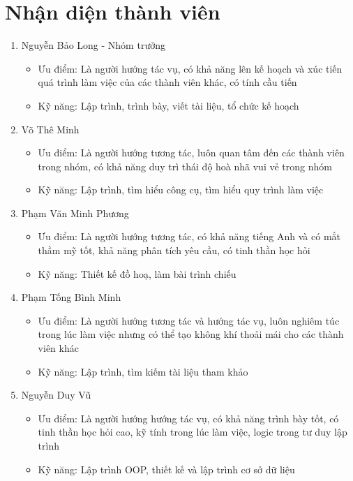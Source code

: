 \documentclass[a4paper, 12pt]{article}
\begin{document}
    \section{Nhận diện thành viên}
    \label{sec:regconize}
    \begin{enumerate}
        \item Nguyễn Bảo Long - Nhóm trưởng
        \begin{itemize}
            \item Ưu điểm: Là người hướng tác vụ, có khả năng lên kế hoạch và xúc tiến quá trình làm việc của các thành viên khác, có tính cầu tiến
            \item Kỹ năng: Lập trình, trình bày, viết tài liệu, tổ chức kế hoạch
        \end{itemize}

        \item Võ Thê Minh
        \begin{itemize}
            \item Ưu điểm: Là người hướng tương tác, luôn quan tâm đến các thành viên trong nhóm, có khả năng duy trì thái độ hoà nhã vui vẻ trong nhóm
            \item Kỹ năng: Lập trình, tìm hiểu công cụ, tìm hiểu quy trình làm việc
        \end{itemize}

        \item Phạm Văn Minh Phương
        \begin{itemize}
            \item Ưu điểm: Là người hướng tương tác, có khả năng tiếng Anh và có mắt thầm mỹ tốt, khả năng phân tích yêu cầu, có tinh thần học hỏi
            \item Kỹ năng: Thiết kế đồ hoạ, làm bài trình chiếu
        \end{itemize}

        \item Phạm Tống Bình Minh
        \begin{itemize}
            \item Ưu điểm: Là người hướng tương tác và hướng tác vụ, luôn nghiêm túc trong lúc làm việc nhưng có thể tạo không khí thoải mái cho các thành viên khác
            \item Kỹ năng: Lập trình, tìm kiếm tài liệu tham khảo
        \end{itemize}

        \item Nguyễn Duy Vũ
        \begin{itemize}
            \item Ưu điểm: Là người hướng hướng tác vụ, có khả năng trình bày tốt, có tinh thần học hỏi cao, kỹ tính trong lúc làm việc, logic trong tư duy lập trình
            \item Kỹ năng: Lập trình OOP, thiết kế và lập trình cơ sở dữ liệu
        \end{itemize}
    \end{enumerate}
    \clearpage
\end{document}
